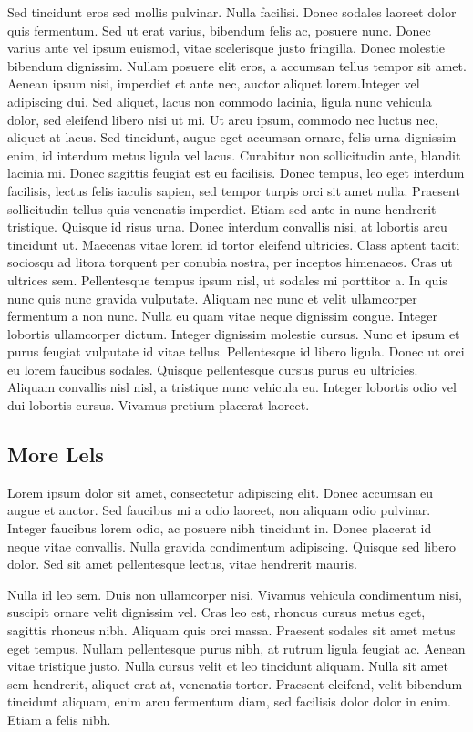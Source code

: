 \documentclass{elec6049report}     %
\begin{document}
Sed tincidunt eros sed mollis pulvinar. Nulla facilisi. Donec sodales laoreet dolor quis fermentum. Sed ut erat varius, bibendum felis ac, posuere nunc. Donec varius ante vel ipsum euismod, vitae scelerisque justo fringilla. Donec molestie bibendum dignissim. Nullam posuere elit eros, a accumsan tellus tempor sit amet. Aenean ipsum nisi, imperdiet et ante nec, auctor aliquet lorem.Integer vel adipiscing dui. Sed aliquet, lacus non commodo lacinia, ligula nunc vehicula dolor, sed eleifend libero nisi ut mi. Ut arcu ipsum, commodo nec luctus nec, aliquet at lacus. Sed tincidunt, augue eget accumsan ornare, felis urna dignissim enim, id interdum metus ligula vel lacus. Curabitur non sollicitudin ante, blandit lacinia mi. Donec sagittis feugiat est eu facilisis. Donec tempus, leo eget interdum facilisis, lectus felis iaculis sapien, sed tempor turpis orci sit amet nulla. Praesent sollicitudin tellus quis venenatis imperdiet. Etiam sed ante in nunc hendrerit tristique. Quisque id risus urna. Donec interdum convallis nisi, at lobortis arcu tincidunt ut. Maecenas vitae lorem id tortor eleifend ultricies. Class aptent taciti sociosqu ad litora torquent per conubia nostra, per inceptos himenaeos. Cras ut ultrices sem. Pellentesque tempus ipsum nisl, ut sodales mi porttitor a. In quis nunc quis nunc gravida vulputate. Aliquam nec nunc et velit ullamcorper fermentum a non nunc. Nulla eu quam vitae neque dignissim congue. Integer lobortis ullamcorper dictum. Integer dignissim molestie cursus. Nunc et ipsum et purus feugiat vulputate id vitae tellus. Pellentesque id libero ligula. Donec ut orci eu lorem faucibus sodales. Quisque pellentesque cursus purus eu ultricies. Aliquam convallis nisl nisl, a tristique nunc vehicula eu. Integer lobortis odio vel dui lobortis cursus. Vivamus pretium placerat laoreet.

\subsection{More Lels}
Lorem ipsum dolor sit amet, consectetur adipiscing elit. Donec accumsan eu augue et auctor. Sed faucibus mi a odio laoreet, non aliquam odio pulvinar. Integer faucibus lorem odio, ac posuere nibh tincidunt in. Donec placerat id neque vitae convallis. Nulla gravida condimentum adipiscing. Quisque sed libero dolor. Sed sit amet pellentesque lectus, vitae hendrerit mauris.

Nulla id leo sem. Duis non ullamcorper nisi. Vivamus vehicula condimentum nisi, suscipit ornare velit dignissim vel. Cras leo est, rhoncus cursus metus eget, sagittis rhoncus nibh. Aliquam quis orci massa. Praesent sodales sit amet metus eget tempus. Nullam pellentesque purus nibh, at rutrum ligula feugiat ac. Aenean vitae tristique justo. Nulla cursus velit et leo tincidunt aliquam. Nulla sit amet sem hendrerit, aliquet erat at, venenatis tortor. Praesent eleifend, velit bibendum tincidunt aliquam, enim arcu fermentum diam, sed facilisis dolor dolor in enim. Etiam a felis nibh.
\end{document}

